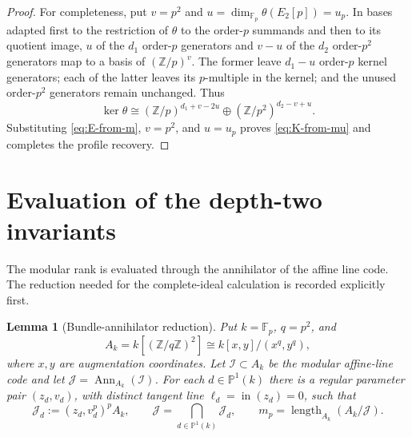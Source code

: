 \documentclass[12pt,a4paper]{article}
\newtheorem{lemma}[theorem]{Lemma}
\theoremstyle{definition}
\newcommand{\Z}{\mathbb Z}
\newcommand{\F}{\mathbb F}
\newcommand{\length}{\operatorname{length}}
\begin{document}
\begin{proof}
For completeness, put $v=p^2$ and
$u=\dim_{\F_p}\theta(E_2[p])=u_p$.  In bases adapted first to the restriction
of $\theta$ to the order-$p$ summands and then to its quotient image, $u$ of
the $d_1$ order-$p$ generators and $v-u$ of the $d_2$ order-$p^2$ generators
map to a basis of $(\Z/p)^v$.  The former leave $d_1-u$ order-$p$ kernel
generators; each of the latter leaves its $p$-multiple in the kernel; and the
unused order-$p^2$ generators remain unchanged.  Thus
\[
 \ker\theta\cong
 (\Z/p)^{d_1+v-2u}\oplus
 (\Z/p^2)^{d_2-v+u}.
\]
Substituting \eqref{eq:E-from-m}, $v=p^2$, and $u=u_p$ proves
\eqref{eq:K-from-mu} and completes the profile recovery.
\end{proof}

\section{Evaluation of the depth-two invariants}\label{sec:S05}

The modular rank is evaluated through the annihilator of the affine line
code.  The reduction needed for the complete-ideal calculation is recorded
explicitly first.

\begin{lemma}[Bundle-annihilator reduction]\label{lem:bundle-annihilator}
Put $k=\F_p$, $q=p^2$, and
\[
 A_k=k[(\Z/q\Z)^2]\cong k[x,y]/(x^q,y^q),
\]
where $x,y$ are augmentation coordinates.  Let $\mathcal I\subset A_k$ be
the modular affine-line code and let
$\mathcal J=\operatorname{Ann}_{A_k}(\mathcal I)$.  For each
$d\in\mathbb P^1(k)$ there is a regular parameter pair $(z_d,v_d)$, with
distinct tangent line $\ell_d=\operatorname{in}(z_d)=0$, such that
\begin{equation}\label{eq:bundle-annihilator}
 \mathcal J_d:=(z_d,v_d^p)^pA_k,
 \qquad \mathcal J=
 \bigcap_{d\in\mathbb P^1(k)}\mathcal J_d,
 \qquad m_p=\length_{A_k}(A_k/\mathcal J).
\end{equation}
\end{lemma}
\end{document}
